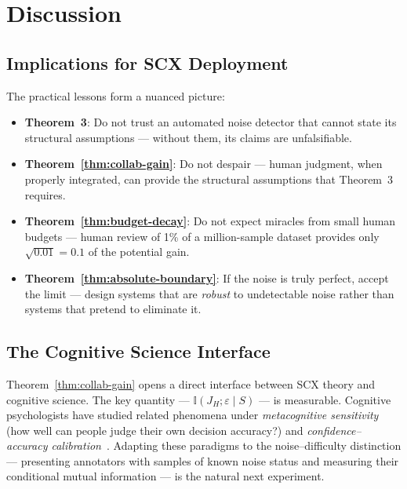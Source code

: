 \documentclass[12pt,a4paper]{article}
\newcommand{\I}{\mathbb{I}}
\begin{document}
\section{Discussion}

\subsection{Implications for SCX Deployment}

The practical lessons form a nuanced picture:
\begin{itemize}
    \item \textbf{Theorem~3}: Do not trust an automated noise detector that
          cannot state its structural assumptions — without them, its claims
          are unfalsifiable.
    \item \textbf{Theorem~\ref{thm:collab-gain}}: Do not despair — human
          judgment, when properly integrated, can provide the structural
          assumptions that Theorem~3 requires.
    \item \textbf{Theorem~\ref{thm:budget-decay}}: Do not expect miracles from
          small human budgets — human review of 1\% of a million-sample
          dataset provides only $\sqrt{0.01} = 0.1$ of the potential gain.
    \item \textbf{Theorem~\ref{thm:absolute-boundary}}: If the noise is truly
          perfect, accept the limit — design systems that are \emph{robust} to
          undetectable noise rather than systems that pretend to eliminate it.
\end{itemize}

\subsection{The Cognitive Science Interface}

Theorem~\ref{thm:collab-gain} opens a direct interface between SCX theory and
cognitive science.  The key quantity — $\I(J_H; \varepsilon \mid S)$ — is
measurable.  Cognitive psychologists have studied related phenomena under
\emph{metacognitive sensitivity} (how well can people judge their own decision
accuracy?) and \emph{confidence--accuracy
calibration}~\citep{fleming2012metacognition, kahneman2011thinking}.  Adapting
these paradigms to the noise--difficulty distinction — presenting annotators
with samples of known noise status and measuring their conditional mutual
information — is the natural next experiment.
\end{document}
